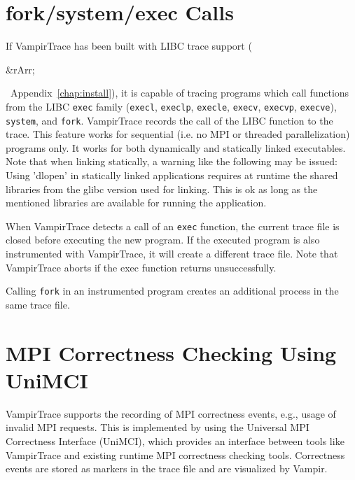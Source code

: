 \documentclass[a4paper,twoside,12pt,BCOR12mm]{scrbook}
\newcommand{\rarr}{$\Rightarrow$}  %
\renewcommand{\rarr}{\begin{rawhtml}&rArr;\end{rawhtml}}   %
\begin{document}
\section{fork/system/exec Calls}
\label{sec:execfork}

  If VampirTrace has been built with LIBC trace support (\rarr\ Appendix~\ref{chap:install}),
  it is capable of tracing programs which call functions from the LIBC \texttt{exec} family
  (\texttt{execl}, \texttt{execlp}, \texttt{execle}, \texttt{execv}, \texttt{execvp}, \texttt{execve}),
  \texttt{system}, and \texttt{fork}.
  VampirTrace records the call of the LIBC function to the trace.
  This feature works for sequential (i.e. no MPI or threaded parallelization) programs only.
  It works for both dynamically and statically linked executables.
  Note that when linking statically, a warning like the following may be issued: Using 'dlopen' in statically linked applications requires at
  runtime the shared libraries from the glibc version used for linking.
  This is ok as long as the mentioned libraries are available for running the application.

  When VampirTrace detects a call of an \texttt{exec} function,
  the current trace file is closed before executing the new program.
  If the executed program is also instrumented with VampirTrace, it will create a different trace file.
  Note that VampirTrace aborts if the exec function returns unsuccessfully.


  Calling \texttt{fork} in an instrumented program creates an additional process in the same trace file.

\section{MPI Correctness Checking Using UniMCI}
\label{sec:unimci}

  VampirTrace supports the recording of MPI correctness events, e.g., usage of invalid MPI requests. This is implemented by using the Universal MPI
  Correctness Interface (UniMCI), which provides an interface between tools like VampirTrace and existing runtime MPI correctness checking tools.
  Correctness events are stored as markers in the trace file and are visualized by Vampir.
\end{document}
